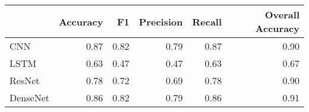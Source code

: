 \begin{tabular}{lrrrrr}
\toprule
{} &  Accuracy &    F1 &  Precision &  Recall &  Overall Accuracy \\
\midrule
CNN      &      0.87 &  0.82 &       0.79 &    0.87 &              0.90 \\
LSTM     &      0.63 &  0.47 &       0.47 &    0.63 &              0.67 \\
ResNet   &      0.78 &  0.72 &       0.69 &    0.78 &              0.90 \\
DenseNet &      0.86 &  0.82 &       0.79 &    0.86 &              0.91 \\
\bottomrule
\end{tabular}
